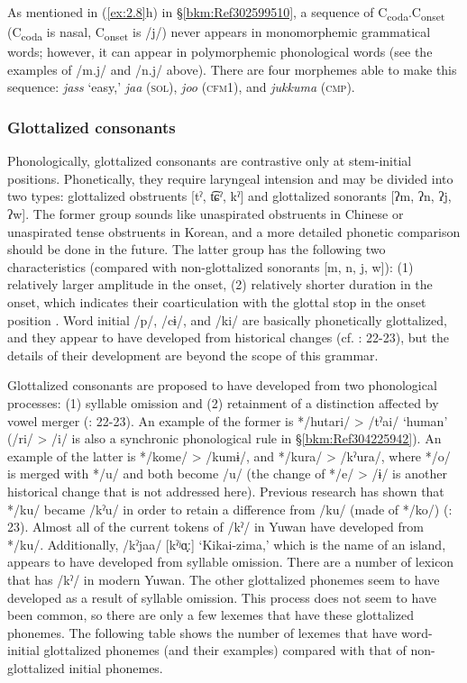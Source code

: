 As mentioned in (\ref{ex:2.8}h) in §\ref{bkm:Ref302599510}, a sequence of C\textsubscript{coda}.C\textsubscript{onset} (C\textsubscript{coda} is nasal, C\textsubscript{onset} is /j/) never appears in monomorphemic grammatical words; however, it can appear in polymorphemic phonological words (see the examples of /m.j/ and /n.j/ above). There are four morphemes able to make this sequence: \textit{jass} ‘easy,’ \textit{jaa} (\textsc{sol}), \textit{joo} (\textsc{cfm}1), and \textit{jukkuma} (\textsc{cmp}).

\subsubsection{Glottalized consonants}
\label{bkm:Ref347180773}\hypertarget{RefHeadingToc395696974}{}
Phonologically, glottalized consonants are contrastive only at stem-initial positions. Phonetically, they require laryngeal intension and may be divided into two types: glottalized obstruents [tˀ, t͡ɕˀ, kˀ] and glottalized sonorants [ʔm, ʔn, ʔj, ʔw]. The former group sounds like unaspirated obstruents in Chinese or unaspirated tense obstruents in Korean, and a more detailed phonetic comparison should be done in the future. The latter group has the following two characteristics (compared with non-glottalized sonorants [m, n, j, w]): (1) relatively larger amplitude in the onset, (2) relatively shorter duration in the onset, which indicates their coarticulation with the glottal stop in the onset position \citep{NiinagaEtAl2011}. Word initial /p/, /cɨ/, and /ki/ are basically phonetically glottalized, and they appear to have developed from historical changes (cf. \citealt{HirayamaEtAl1966}: 22-23), but the details of their development are beyond the scope of this grammar.

Glottalized consonants are proposed to have developed from two phonological processes: (1) syllable omission and (2) retainment of a distinction affected by vowel merger (\citealt{HirayamaEtAl1966}: 22-23). An example of the former is */hutari/ > /tˀai/ ‘human’ (/ri/ > /i/ is also a synchronic phonological rule in §\ref{bkm:Ref304225942}). An example of the latter is */kome/ > /kumɨ/, and */kura/ > /kˀura/, where */o/ is merged with */u/ and both become /u/ (the change of */e/ > /ɨ/ is another historical change that is not addressed here). Previous research has shown that */ku/ became /kˀu/ in order to retain a difference from /ku/ (made of */ko/) (\citealt{HirayamaEtAl1966}: 23). Almost all of the current tokens of /kˀ/ in Yuwan have developed from */ku/. Additionally, /kˀjaa/ [kˀʲɑ̟ː] ‘Kikai-zima,’ which is the name of an island, appears to have developed from syllable omission. There are a number of lexicon that has /kˀ/ in modern Yuwan. The other glottalized phonemes seem to have developed as a result of syllable omission. This process does not seem to have been common, so there are only a few lexemes that have these glottalized phonemes. The following table shows the number of lexemes that have word-initial glottalized phonemes (and their examples) compared with that of non-glottalized initial phonemes.

